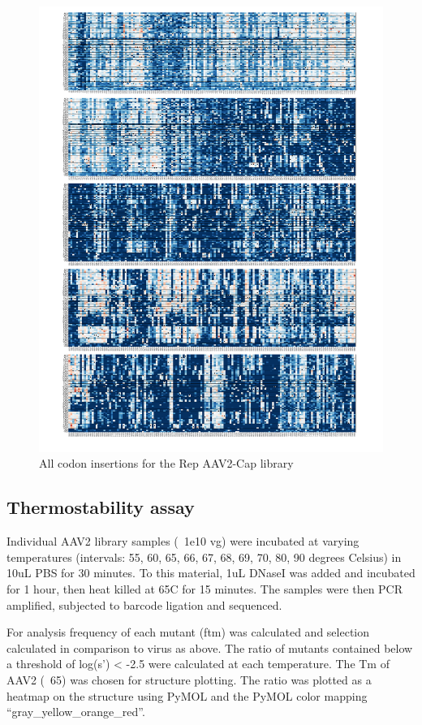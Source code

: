 \begin{figure}
\includegraphics[width=\textwidth,height=\textheight]{figures/20180903_AAV2_supp_fig3_Rep_subs.pdf} 
\caption[All codon insertions for the Rep AAV2-Cap  library]{All codon insertions for the Rep AAV2-Cap  library
\label{fig:Figure 9}}
\end{figure}


\subsection{Thermostability assay}
Individual AAV2 library samples (~1e10 vg) were incubated at varying temperatures (intervals: 55, 60, 65, 66, 67, 68, 69, 70, 80, 90 degrees Celsius) in 10uL PBS for 30 minutes. To this material, 1uL DNaseI was added and incubated for 1 hour, then heat killed at 65C for 15 minutes. The samples were then PCR amplified, subjected to barcode ligation and sequenced.  

For analysis frequency of each mutant (ftm) was calculated and selection calculated in comparison to virus as above. The ratio of mutants contained below a threshold of log(s’) < -2.5 were calculated at each temperature. The Tm  of AAV2 (~65) was chosen for structure plotting.
The ratio was plotted as a heatmap on the structure using PyMOL and the PyMOL color mapping “gray\_yellow\_orange\_red”.  

